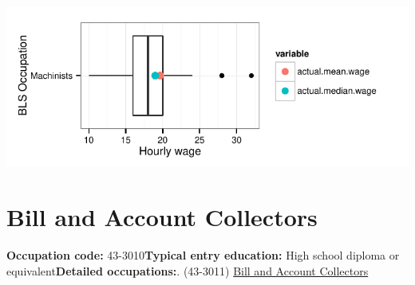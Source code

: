 \documentclass[a4paper,10pt]{article}\usepackage[]{graphicx}\usepackage[]{color}
\makeatletter
\def\maxwidth{ %
  \ifdim\Gin@nat@width>\linewidth
    \linewidth
  \else
    \Gin@nat@width
  \fi
}
\makeatother
\begin{document}
{\centering \includegraphics[width=\maxwidth]{figure/unnamed-chunk-286} 

}


\newpage\section{Bill and Account Collectors}\textbf{Occupation code:} 43-3010\newline\textbf{Typical entry education:} High school diploma or equivalent\newline\textbf{Detailed occupations:}. (43-3011)  \href{http://www.bls.gov/oes/current/oes433011.htm}{Bill and Account Collectors}\newline%
\end{document}
